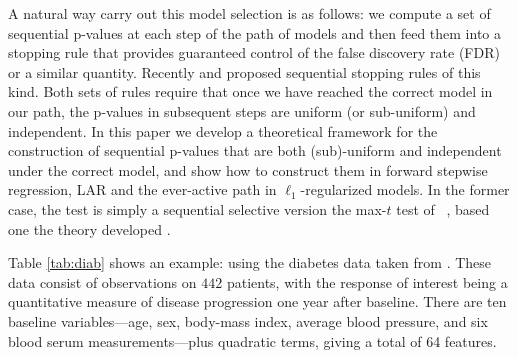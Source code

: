 \documentclass{article}
\begin{document}
A natural way carry out this model selection is as follows: we compute a set  of sequential p-values   at each step of the path of models and then feed them into a stopping rule
that provides guaranteed control of the false discovery rate (FDR) or a similar quantity. Recently  \citet{gsell2013sequential} and \citet{li2015accumulation} proposed sequential stopping rules of this kind.
Both sets of rules require that once we have reached the correct model in our path, the p-values in subsequent steps are uniform (or sub-uniform)
and independent.
In this paper we develop a theoretical framework for the construction of sequential p-values  that are both (sub)-uniform and independent under the correct model,
and show how to construct them  in forward stepwise regression, LAR and the ever-active path in $\ell_1$-regularized models.
In the former case, the test is simply a sequential selective version the max-$t$ test of ~\citet{bujaxxxxmaxT}, based one the theory developed \citet{fithian2014optimal}.

Table \ref{tab:diab} shows an example: using the diabetes data taken from \cite{LARS}.
These data consist of  observations on $442$ patients, with the response of interest being a quantitative measure of disease progression one year after baseline.
There are ten baseline variables---age, sex, body-mass index, average blood pressure,
and six blood serum measurements---plus quadratic terms, giving a total of 64 features.
\end{document}
